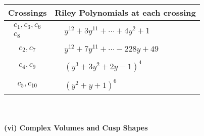 \documentclass[1p]{elsarticle_modified}
\theoremstyle{definition}
\begin{document}
\begin{tabular}{m{50pt}|m{274pt}}
Crossings & \hspace{64pt}Riley Polynomials at each crossing \\
\hline $$\begin{aligned}c_{1},c_{3},c_{6}\\c_{8}\end{aligned}$$&$\begin{aligned}
&y^{12}+3 y^{11}+\cdots+4 y^2+1
\end{aligned}$\\
\hline $$\begin{aligned}c_{2},c_{7}\end{aligned}$$&$\begin{aligned}
&y^{12}+7 y^{11}+\cdots-228 y+49
\end{aligned}$\\
\hline $$\begin{aligned}c_{4},c_{9}\end{aligned}$$&$\begin{aligned}
&(y^3+3 y^2+2 y-1)^4
\end{aligned}$\\
\hline $$\begin{aligned}c_{5},c_{10}\end{aligned}$$&$\begin{aligned}
&(y^2+y+1)^6
\end{aligned}$\\
\hline
\end{tabular}\\~\\
\newpage\flushleft \textbf{(vi) Complex Volumes and Cusp Shapes}
\end{document}

